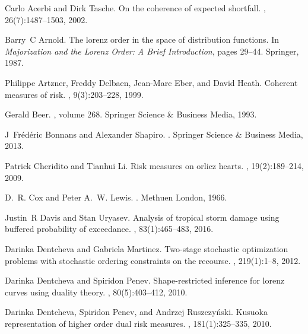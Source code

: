\documentclass[10pt,letterpaper]{article}
\newcommand{\1}{1{\hskip -2.55 pt}\hbox{I}}
\begin{document}

\begin{thebibliography}{10}

Carlo Acerbi and Dirk Tasche.
\newblock On the coherence of expected shortfall.
, 26(7):1487--1503, 2002.

Barry~C Arnold.
\newblock The lorenz order in the space of distribution functions.
\newblock In {\em Majorization and the Lorenz Order: A Brief Introduction},
  pages 29--44. Springer, 1987.

Philippe Artzner, Freddy Delbaen, Jean-Marc Eber, and David Heath.
\newblock Coherent measures of risk.
, 9(3):203--228, 1999.

Gerald Beer.
, volume 268.
\newblock Springer Science \& Business Media, 1993.

J~Fr{\'e}d{\'e}ric Bonnans and Alexander Shapiro.
.
\newblock Springer Science \& Business Media, 2013.

Patrick Cheridito and Tianhui Li.
\newblock Risk measures on orlicz hearts.
, 19(2):189--214, 2009.

D.~R. Cox and Peter A.~W. Lewis.
.
\newblock Methuen London, 1966.

Justin~R Davis and Stan Uryasev.
\newblock Analysis of tropical storm damage using buffered probability of
  exceedance.
, 83(1):465--483, 2016.

Darinka Dentcheva and Gabriela Martinez.
\newblock Two-stage stochastic optimization problems with stochastic ordering
  constraints on the recourse.
, 219(1):1--8, 2012.

Darinka Dentcheva and Spiridon Penev.
\newblock Shape-restricted inference for lorenz curves using duality theory.
, 80(5):403--412, 2010.

Darinka Dentcheva, Spiridon Penev, and Andrzej Ruszczy{\'n}ski.
\newblock Kusuoka representation of higher order dual risk measures.
, 181(1):325--335, 2010.


\end{thebibliography}
\end{document}
